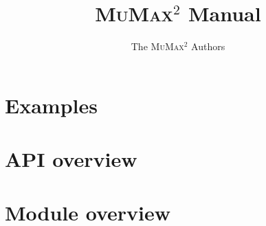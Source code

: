 \documentclass[a4paper, twoside]{article}
\newcommand{\mumax}{\textsc{MuMax}$^2$\xspace}
\begin{document}
\hypersetup{breaklinks=true}
\setlength{\parindent}{0cm}

\title{\mumax Manual}
\author{The \mumax Authors}
\maketitle


\tableofcontents




\section{Examples} \label{examples}



\section{API overview}


\section{Module overview}\label{modules}


\appendix

%
\printindex
\end{document}
